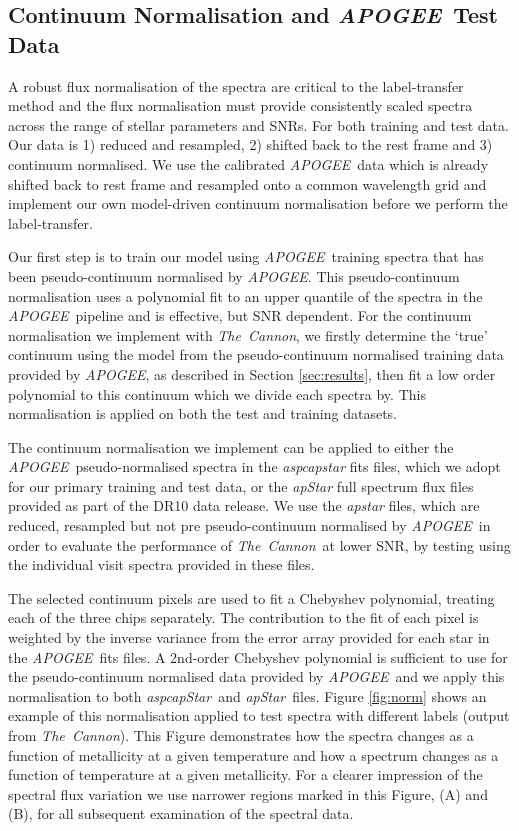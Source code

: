 \documentclass[12pt, preprint]{aastex}
\newcommand{\tc}{\textsl{The~Cannon}}
\newcommand{\apogee}{\textsl{APOGEE}}
\newcommand{\aspcapstar}{\textsl{aspcapStar}}
\newcommand{\apstar}{\textsl{apStar}}
\begin{document}
\subsection{Continuum Normalisation and \apogee\ Test Data}

A robust flux normalisation of the spectra are critical to the label-transfer method and the flux normalisation must provide consistently scaled spectra across the range of stellar parameters and SNRs. For both training and test data. Our data is 1) reduced and resampled, 2) shifted back to the rest frame and 3) continuum normalised.  We use the calibrated \apogee\ data which is already shifted back to rest frame and resampled onto a common wavelength grid and implement our own model-driven continuum normalisation before we perform the label-transfer. 

Our first step is to train our model using \apogee\ training spectra that has been pseudo-continuum normalised by \apogee. This pseudo-continuum normalisation uses a polynomial fit to an upper quantile of the spectra in the \apogee\ pipeline \citep{Meszaros2013} and is effective, but SNR dependent.  For the continuum normalisation we implement with \tc, we firstly determine the  `true' continuum using the model from the pseudo-continuum normalised training data provided by \apogee, as described in Section \ref{sec:results}, then fit a low order polynomial to this continuum which we divide each spectra by. This normalisation is applied on both the test and training datasets. 

The continuum normalisation we implement can be applied to either the \apogee\ pseudo-normalised spectra in the \textit{aspcapstar} fits files, which we adopt for our primary training and test data, or the \textit{apStar} full spectrum flux files provided as part of the DR10 data release. We use the \textit{apstar} files, which are reduced, resampled but not pre pseudo-continuum normalised by \apogee\, in order to evaluate the performance of \tc\ at lower SNR, by testing using the individual visit spectra provided in these files.  

The selected continuum pixels are used to fit a Chebyshev polynomial, treating each of the three chips separately. The contribution to the fit of each pixel is weighted by the inverse variance from the error array provided for each star in the \apogee\ fits files. A 2nd-order Chebyshev polynomial is sufficient to use for the pseudo-continuum normalised data provided by \apogee\ and we apply this normalisation to both \aspcapstar\ and  \apstar\ files.  Figure \ref{fig:norm} shows an example of this normalisation applied to test spectra with different labels (output from \tc). This Figure demonstrates how the spectra changes as a function of metallicity at a given temperature and how a spectrum changes as a function of temperature at a given metallicity. For a clearer impression of the spectral flux variation we use narrower regions marked in this Figure, (A) and (B), for all subsequent examination of the spectral data. 
\end{document}
